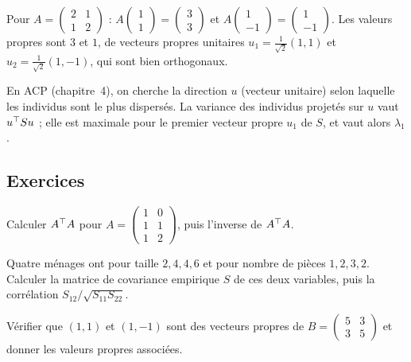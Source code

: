 \begin{exemple}
Pour $A=\begin{pmatrix}2&1\\1&2\end{pmatrix}$ : $A\begin{pmatrix}1\\1\end{pmatrix}=\begin{pmatrix}3\\3\end{pmatrix}$ et $A\begin{pmatrix}1\\-1\end{pmatrix}=\begin{pmatrix}1\\-1\end{pmatrix}$.
Les valeurs propres sont $3$ et $1$, de vecteurs propres unitaires $u_1=\frac{1}{\sqrt2}(1,1)$ et $u_2=\frac{1}{\sqrt2}(1,-1)$, qui sont bien orthogonaux.
\end{exemple}

\begin{remarque}
En ACP (chapitre~4), on cherche la direction $u$ (vecteur unitaire) selon laquelle les individus sont le plus dispersés.
La variance des individus projetés sur $u$ vaut $u^{\top} Su$ ; elle est maximale pour le premier vecteur propre $u_1$ de $S$, et vaut alors $\lambda_1$.
\end{remarque}

\subsection*{Exercices}

\begin{exercice}
\label{ex:produit}
Calculer $A^{\top} A$ pour $A=\begin{pmatrix}1&0\\1&1\\1&2\end{pmatrix}$, puis l'inverse de $A^{\top} A$.
\end{exercice}

\begin{exercice}
\label{ex:covariance}
Quatre ménages ont pour taille $2,4,4,6$ et pour nombre de pièces $1,2,3,2$. Calculer la matrice de covariance empirique $S$ de ces deux variables, puis la corrélation $S_{12}/\sqrt{S_{11}S_{22}}$.
\end{exercice}

\begin{exercice}
\label{ex:spectre}
Vérifier que $(1,1)$ et $(1,-1)$ sont des vecteurs propres de $B=\begin{pmatrix}5&3\\3&5\end{pmatrix}$ et donner les valeurs propres associées.
\end{exercice}
